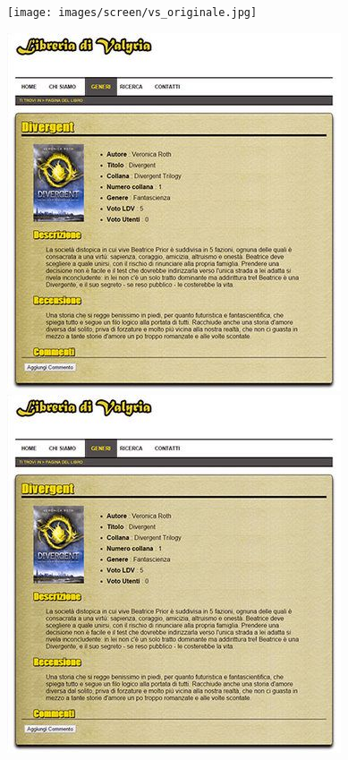 \begin{figure}[H]
\begin{minipage}{0.45\textwidth}
\texttt{[image: images/screen/vs\_originale.jpg]}
\end{minipage}
\hspace{\fill}
\begin{minipage}{0.45\textwidth}
\includegraphics[width=\linewidth]{images/screen/deuteranope.jpg}
\end{minipage}
\vspace*{0.5cm}
\begin{minipage}{0.45\textwidth}
\includegraphics[width=\linewidth]{images/screen/protanope.jpg}

\end{minipage}
\end{figure}

